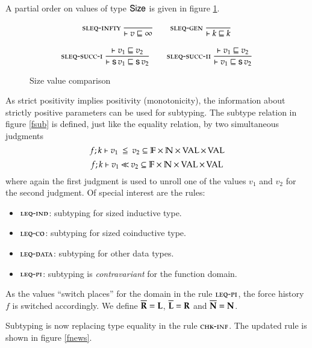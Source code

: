 A partial order on values of type $\mathsf{Size}$ is given in figure \ref{substage}. \begin{figure}[tp]
\begin{gather*}
\mbox{\sc sleq-infty}\ \dfrac{}{\vdash v\sqsubseteq\infty}
\qquad
\mbox{\sc sleq-gen}\ \dfrac{}{\vdash k\sqsubseteq k}
\\[2ex]
\mbox{\sc sleq-succ-i}\ \dfrac{\vdash v_1\sqsubseteq v_2}{\vdash\mathsf{s}\, v_1\sqsubseteq\mathsf{s}\, v_2}
\qquad
\mbox{\sc sleq-succ-ii}\ \dfrac{\vdash v_1\sqsubseteq v_2}{\vdash v_1\sqsubseteq\mathsf{s}\, v_2}
\end{gather*}
\caption{Size value comparison}
\label{substage}
\end{figure} As strict positivity implies positivity (monotonicity), the information about strictly positive parameters can be used for subtyping. The subtype relation in figure \ref{fsub} is defined, just like the equality relation, by two simultaneous judgments
\[f;k\vdash v_1\:\leqq\:v_2 \subseteq \mathbb{F} \times \mathbb{N} \times \operatorname{VAL} \times \operatorname{VAL} \]
\[f;k\vdash v_1{\:\ll\:}v_2 \subseteq \mathbb{F} \times \mathbb{N} \times\operatorname{VAL} \times \operatorname{VAL} \]
where again the first judgment is used to unroll one of the values $v_1$ and $v_2$ for the second judgment.
Of special interest are the rules:
\begin{itemize}
\item
$\mbox{\sc leq-ind}$: subtyping for sized inductive type. 
\item
$\mbox{\sc leq-co}$: subtyping for sized coinductive type.
\item
$\mbox{\sc leq-data}$: subtyping for other data types.
\item
$\mbox{\sc leq-pi}$: subtyping is \emph{contravariant} for the function domain. 
\end{itemize}
As the values ``switch places'' for the domain in the rule $\mbox{\sc leq-pi}$, the force history $f$ is switched accordingly.
We define $\overline{\mathbf{R}}=\mathbf{L}$,  $\overline{\mathbf{L}}=\mathbf{R}$ and $\overline{\mathbf{N}}=\mathbf{N}$.

Subtyping is now replacing type equality in the rule $\mbox{\sc chk-inf}$. 
The updated rule is shown in figure \ref{fnews}.

